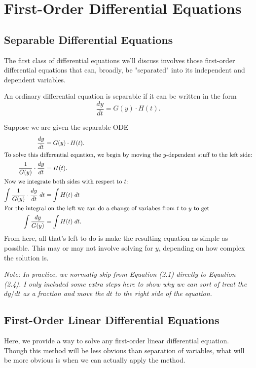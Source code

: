 \documentclass[../m82main.tex]{subfiles}
\begin{document}
\chapter{First-Order Differential Equations}

\section{Separable Differential Equations}
The first class of differential equations we'll discuss involves those first-order differential equations that can, broadly, be "separated" into its independent and dependent variables.

\begin{definition}
    An ordinary differential equation is separable if it can be written in the form
    \[ \frac{dy}{dt} = G(y) \cdot H(t). \]
\end{definition}

\begin{example}
    Suppose we are given the separable ODE
    \begin{align}
        \frac{dy}{dt} &= G(y) \cdot H(t). \\
        \intertext{To solve this differential equation, we begin by moving the $y$-dependent stuff to the left side:}
        \frac{1}{G(y)} \cdot \frac{dy}{dt} &= H(t). \\
        \intertext{Now we integrate both sides with respect to $t$:}
        \int \frac{1}{G(y)} \cdot \frac{dy}{dt} \;dt &= \int H(t) \;dt \\
        \intertext{For the integral on the left we can do a change of variabes from $t$ to $y$ to get}
        \int \frac{dy}{G(y)} &= \int H(t) \;dt.
    \end{align}
    From here, all that's left to do is make the resulting equation as simple as possible.
    This may or may not involve solving for $y$, depending on how complex the solution is.

    \medskip
    \textit{Note: In practice, we normally skip from Equation (2.1) directly to Equation (2.4).
    I only included some extra steps here to show why we can sort of treat the $dy/dt$ as a fraction and move the $dt$ to the right side of the equation.}
\end{example}

\section{First-Order Linear Differential Equations}
Here, we provide a way to solve any first-order linear differential equation.
Though this method will be less obvious than separation of variables, what will be more obvious is when we can actually apply the method.
\end{document}
